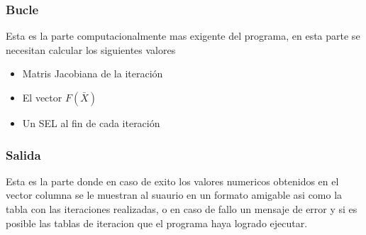 \documentclass[11pt]{article}
\begin{document}
\subsubsection{Bucle}
Esta es la parte computacionalmente mas exigente del programa, en esta parte se necesitan calcular los siguientes valores
\begin{itemize}
  \item Matris Jacobiana de la iteración
  \item El vector $F(\bar{X})$
  \item Un SEL al fin de cada iteración
\end{itemize}
\subsubsection{Salida}
Esta es la parte donde en caso de exito los valores numericos obtenidos en el vector columna se le muestran al suaurio en un formato amigable asi como la tabla con las iteraciones realizadas, o en caso de fallo un mensaje de error y si es posible las tablas de iteracion que el programa haya logrado ejecutar.  
\clearpage

\nocite{*}

\end{document}
